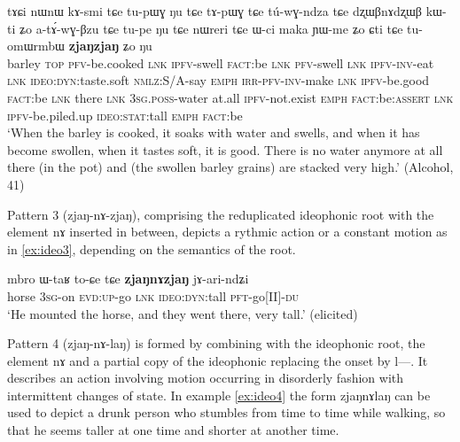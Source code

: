 \documentclass[oldfontcommands,oneside,a4paper,11pt]{article}
\newcommand{\ipa}[1]{{\phon \mbox{#1}}} %
\begin{document}
 
  \begin{exe} 
\ex  \label{ex:zjaNzjaN2}
\gll 
 \ipa{tɤɕi}  	\ipa{nɯnɯ}  	\ipa{kɤ-smi}  	\ipa{tɕe}  	\ipa{tu-pɯɣ}  	\ipa{ŋu}  	\ipa{tɕe}  	\ipa{tɤ-pɯɣ}  	\ipa{tɕe}  	\ipa{tú-wɣ-ndza}  	\ipa{tɕe}  	\ipa{dʐɯβnɤdʐɯβ}  	\ipa{kɯ-ti}  	\ipa{ʑo}  	\ipa{a-tɤ́-wɣ-βzu}  	\ipa{tɕe}  	\ipa{tu-pe}  	\ipa{ŋu}  	\ipa{tɕe}  	\ipa{nɯreri}  	\ipa{tɕe}  	\ipa{ɯ-ci}  	\ipa{maka}  	\ipa{ɲɯ-me}  	\ipa{ʑo}  	\ipa{ɕti}  	\ipa{tɕe}  	\ipa{tu-omɯrmbɯ}  	\ipa{\textbf{zjaŋzjaŋ}}  	\ipa{ʑo}  	\ipa{ŋu}  \\
 barley \textsc{top} \textsc{pfv}-be.cooked \textsc{lnk} \textsc{ipfv}-swell \textsc{fact}:be \textsc{lnk} \textsc{pfv}-swell \textsc{lnk} \textsc{ipfv-inv}-eat \textsc{lnk} \textsc{ideo:dyn}:taste.soft \textsc{nmlz}:S/A-say \textsc{emph} \textsc{irr-pfv-inv}-make \textsc{lnk} \textsc{ipfv}-be.good \textsc{fact}:be \textsc{lnk} there \textsc{lnk} \textsc{3sg.poss}-water at.all \textsc{ipfv}-not.exist  \textsc{emph} \textsc{fact}:be:\textsc{assert} \textsc{lnk} \textsc{ipfv}-be.piled.up \textsc{ideo:stat}:tall \textsc{emph} \textsc{fact}:be  \\
 \glt `When the barley is cooked, it soaks with water and swells, and when it has become swollen, when it tastes soft, it is good. There is no water anymore at all there (in the pot) and (the swollen barley grains) are stacked very high.'  (Alcohol, 41)
 \end{exe}
 
 
 Pattern 3 (\ipa{zjaŋ-nɤ-zjaŋ}), comprising the reduplicated ideophonic root with the element \ipa{nɤ} inserted in between, depicts a rythmic action  or a constant motion as in \ref{ex:ideo3}, depending on the semantics of the root.
 
 
 \begin{exe} 
\ex  \label{ex:ideo3}
\gll 
\ipa{mbro}  	\ipa{ɯ-taʁ}  		\ipa{to-ɕe} \ipa{tɕe}   \ipa{\textbf{zjaŋnɤzjaŋ}}  	\ipa{jɤ-ari-ndʑi}  
  \\
horse \textsc{3sg}-on  \textsc{evd:up}-go \textsc{lnk} \textsc{ideo:dyn}:tall  \textsc{pft}-go[II]-\textsc{du} \\
\glt `He mounted the horse, and  they went there, very tall.'  (elicited)
 \end{exe} 
 
Pattern 4 (\ipa{zjaŋ-nɤ-laŋ}) is formed by combining with the ideophonic root, the element \ipa{nɤ} and a partial copy of the ideophonic replacing the onset by \ipa{l---}. It describes an action involving motion  occurring in disorderly fashion with intermittent changes of state. In example \ref{ex:ideo4} the form  \ipa{zjaŋnɤlaŋ} can be used to depict a drunk person who stumbles from time to time while walking, so that he seems taller at one time and shorter at another time.
 
\end{document}
